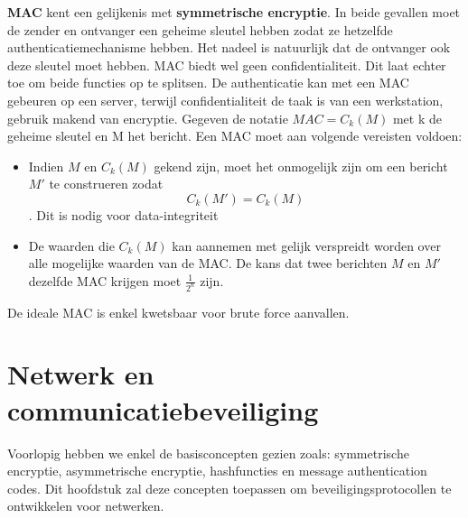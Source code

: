 \documentclass{report}
\begin{document}
\begin{itemize}
	\textbf{MAC} kent een gelijkenis met \textbf{symmetrische encryptie}. In beide gevallen moet de zender en ontvanger een geheime sleutel hebben zodat ze hetzelfde authenticatiemechanisme hebben. Het nadeel is natuurlijk dat de ontvanger ook deze sleutel moet hebben. MAC biedt wel geen confidentialiteit. Dit laat echter toe om beide functies op te splitsen. De authenticatie kan met een MAC gebeuren op een server, terwijl confidentialiteit de taak is van een werkstation, gebruik makend van encryptie. Gegeven de notatie \textbf{$MAC = C_k(M)$} met k de geheime sleutel en M het bericht. Een MAC moet aan volgende vereisten voldoen:
	\begin{itemize}
		\item Indien $M$ en $C_k(M)$ gekend zijn, moet het onmogelijk zijn om een bericht $M'$ te construeren zodat \textbf{$$C_k(M') = C_k(M)$$}. Dit is nodig voor data-integriteit
		
		\item De waarden die $C_k(M)$ kan aannemen met gelijk verspreidt worden over alle mogelijke waarden van de MAC. De kans dat twee berichten $M$ en $M'$ dezelfde MAC krijgen moet $\frac{1}{2^n}$ zijn.
	\end{itemize}

De ideale MAC is enkel kwetsbaar voor brute force aanvallen. 

	\end{itemize}


	\chapter{Netwerk en communicatiebeveiliging}
	Voorlopig hebben we enkel de basisconcepten gezien zoals: symmetrische encryptie, asymmetrische encryptie, hashfuncties en message authentication codes. Dit hoofdstuk zal deze concepten toepassen om beveiligingsprotocollen te ontwikkelen voor netwerken.
\end{document}
